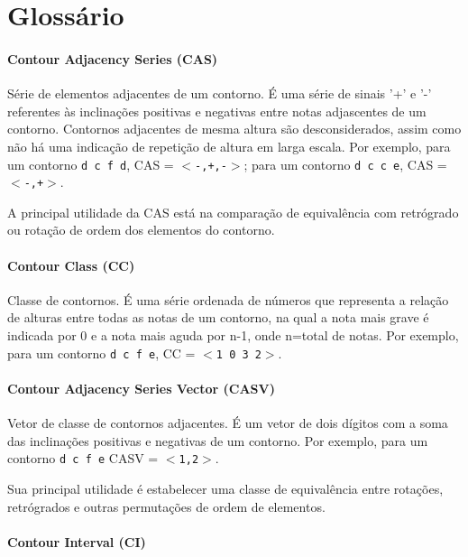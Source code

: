 \documentclass[12pt,brazil]{book}
\begin{document}
\section{Glossário}
\label{sec:glossario}

\paragraph{Contour Adjacency Series (CAS)}
\label{sec:cont-adjac-seri}

Série de elementos adjacentes de um contorno. É uma série de sinais
'+' e '-' referentes às inclinações positivas e negativas entre notas
adjascentes de um contorno. Contornos adjacentes de mesma altura são
desconsiderados, assim como não há uma indicação de repetição de
altura em larga escala. Por exemplo, para um contorno \texttt{d c f
  d}, CAS = \texttt{$<$-,+,-$>$}; para um contorno \texttt{d c c e}, CAS =
\texttt{$<$-,+$>$}.

A principal utilidade da CAS está na comparação de equivalência com
retrógrado ou rotação de ordem dos elementos do contorno.

\paragraph{Contour Class (CC)}
\label{sec:contour-class-cc}

Classe de contornos. É uma série ordenada de números que representa a
relação de alturas entre todas as notas de um contorno, na qual a nota
mais grave é indicada por 0 e a nota mais aguda por n-1, onde n=total
de notas. Por exemplo, para um contorno \texttt{d c f e}, CC = \texttt{$<$1 0
3 2$>$}.

\paragraph{Contour Adjacency Series Vector (CASV)}
\label{sec:cont-adjac-seri-1}

Vetor de classe de contornos adjacentes. É um vetor de dois dígitos
com a soma das inclinações positivas e negativas de um contorno. Por
exemplo, para um contorno \texttt{d c f e} CASV = \texttt{$<$1,2$>$}.

Sua principal utilidade é estabelecer uma classe de equivalência entre
rotações, retrógrados e outras permutações de ordem de elementos.

\paragraph{Contour Interval (CI)}
\label{sec:contour-interval-ci}
\end{document}
